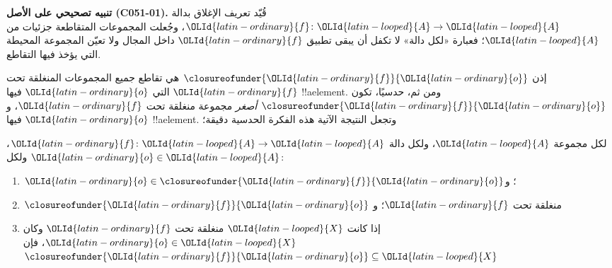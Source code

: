\documentclass[../../../include/open-logic-section]{subfiles}
\begin{document}
\textbf{تنبيه تصحيحي على الأصل (C051-01).} قُيّد تعريف الإغلاق بدالة
$\OLId{latin-ordinary}{f}\colon \OLId{latin-looped}{A}\to \OLId{latin-looped}{A}$، وجُعلت المجموعات المتقاطعة جزئيات من $\OLId{latin-looped}{A}$؛ فعبارة
«لكل دالة» لا تكفل أن يبقى تطبيق $\OLId{latin-ordinary}{f}$ داخل المجال ولا تعيّن المجموعة
المحيطة التي يؤخذ فيها التقاطع.

إذن $\closureofunder{\OLId{latin-ordinary}{f}}{\OLId{latin-ordinary}{o}}$ هي تقاطع جميع المجموعات المنغلقة تحت $\OLId{latin-ordinary}{f}$
التي $\OLId{latin-ordinary}{o}$ فيها !!a{element}. ومن ثم، حدسيًا، تكون
$\closureofunder{\OLId{latin-ordinary}{f}}{\OLId{latin-ordinary}{o}}$ \emph{أصغر} مجموعة منغلقة تحت $\OLId{latin-ordinary}{f}$، و$\OLId{latin-ordinary}{o}$ فيها
!!a{element}. وتجعل النتيجة الآتية هذه الفكرة الحدسية دقيقة؛
\begin{lem}
	لكل مجموعة $\OLId{latin-looped}{A}$، ولكل دالة $\OLId{latin-ordinary}{f}\colon \OLId{latin-looped}{A}\to \OLId{latin-looped}{A}$، ولكل $\OLId{latin-ordinary}{o} \in \OLId{latin-looped}{A}$:
	\begin{enumerate}
		\item{} $\OLId{latin-ordinary}{o} \in \closureofunder{\OLId{latin-ordinary}{f}}{\OLId{latin-ordinary}{o}}$؛ و
		\item{} $\closureofunder{\OLId{latin-ordinary}{f}}{\OLId{latin-ordinary}{o}}$ منغلقة تحت $\OLId{latin-ordinary}{f}$؛ و
		\item{} إذا كانت $\OLId{latin-looped}{X}$ منغلقة تحت $\OLId{latin-ordinary}{f}$ وكان $\OLId{latin-ordinary}{o} \in
		\OLId{latin-looped}{X}$، فإن $\closureofunder{\OLId{latin-ordinary}{f}}{\OLId{latin-ordinary}{o}} \subseteq \OLId{latin-looped}{X}$
	\end{enumerate}
\end{lem}
\end{document}
